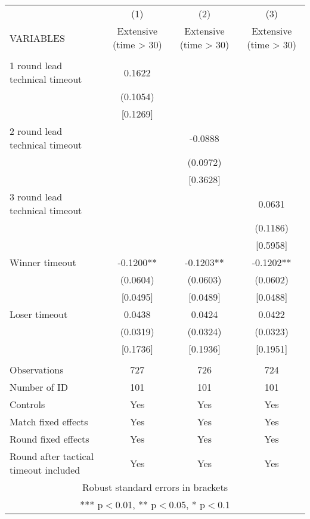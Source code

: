 \documentclass[]{article}
\begin{document}
\begin{tabular}{lccc} \hline
 & (1) & (2) & (3) \\
VARIABLES & Extensive (time > 30) & Extensive (time > 30) & Extensive (time > 30) \\ \hline
 &  &  &  \\
1 round lead technical timeout & 0.1622 &  &  \\
 & (0.1054) &  &  \\
 & [0.1269] &  &  \\
2 round lead technical timeout &  & -0.0888 &  \\
 &  & (0.0972) &  \\
 &  & [0.3628] &  \\
3 round lead technical timeout &  &  & 0.0631 \\
 &  &  & (0.1186) \\
 &  &  & [0.5958] \\
Winner timeout & -0.1200** & -0.1203** & -0.1202** \\
 & (0.0604) & (0.0603) & (0.0602) \\
 & [0.0495] & [0.0489] & [0.0488] \\
Loser timeout & 0.0438 & 0.0424 & 0.0422 \\
 & (0.0319) & (0.0324) & (0.0323) \\
 & [0.1736] & [0.1936] & [0.1951] \\
 &  &  &  \\
Observations & 727 & 726 & 724 \\
Number of ID & 101 & 101 & 101 \\
Controls & Yes & Yes & Yes \\
Match fixed effects & Yes & Yes & Yes \\
Round fixed effects & Yes & Yes & Yes \\
 Round after tactical timeout included & Yes & Yes & Yes \\ \hline
\multicolumn{4}{c}{ Robust standard errors in brackets} \\
\multicolumn{4}{c}{ *** p$<$0.01, ** p$<$0.05, * p$<$0.1} \\
\end{tabular}
\end{document}
